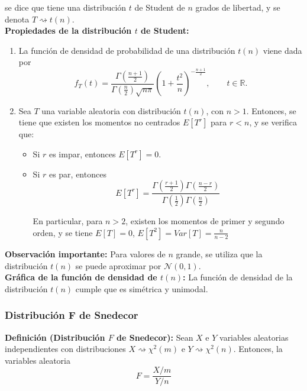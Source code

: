 \documentclass{article}
\begin{document}
se dice que tiene una distribución $t$ de Student de $n$ grados de libertad, y se denota $T\rightsquigarrow t(n)$.\\

\textbf{Propiedades de la distribución $t$ de Student:}
\begin{enumerate}
\item La función de densidad de probabilidad de una distribución $t(n)$ viene dada por
\begin{equation*}
f_T(t)=\frac{\Gamma\left(\frac{n+1}{2}\right)}{\Gamma\left(\frac{n}{2}\right)\sqrt{n\pi}}\left(1+\frac{t^2}{n}\right)^{-\frac{n+1}{2}},\qquad t\in\mathbb{R}.
\end{equation*}

\item Sea $T$ una variable aleatoria con distribución $t(n)$, con $n>1$. Entonces, se tiene que existen los momentos no centrados $E[T^r]$ para $r<n$, y se verifica que:
	\begin{itemize}
	\item Si $r$ es impar, entonces $E[T^r]=0$.
	
	\item Si $r$ es par, entonces 
	\begin{equation*}
	E[T^r]=\frac{\Gamma\left(\frac{r+1}{2}\right)\Gamma\left(\frac{n-r}{2}\right)}{\Gamma\left(\frac{1}{2}\right)\Gamma\left(\frac{n}{2}\right)}
	\end{equation*}
	
	En particular, para $n>2$, existen los momentos de primer y segundo orden, y se tiene $E[T]=0$, $E[T^2]=Var[T]=\frac{n}{n-2}$
	\end{itemize}
\end{enumerate}

\textbf{Observación importante:} Para valores de $n$ grande, se utiliza que la distribución $t(n)$ se puede aproximar por $\mathcal{N}(0,1)$.\\

\textbf{Gráfica de la función de densidad de $t(n)$:} La función de densidad de la distribución $t(n)$ cumple que es simétrica y unimodal.

\subsubsection{Distribución F de Snedecor}
\textbf{Definición (Distribución $F$ de Snedecor):} Sean $X$ e $Y$ variables aleatorias independientes con distribuciones $X\rightsquigarrow \chi^2(m)$ e $Y\rightsquigarrow \chi^2(n)$. Entonces, la variables aleatoria
\begin{equation*}
F=\frac{X/m}{Y/n}
\end{equation*} 
\end{document}
